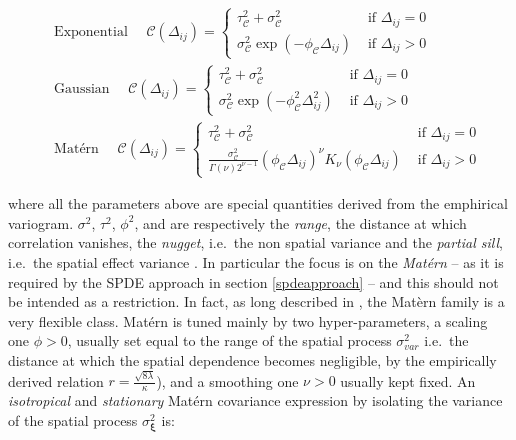 \documentclass[
  12pt,
  a4paper,
  oneside]{book}
\theoremstyle{definition}
\theoremstyle{definition}
\theoremstyle{definition}
\theoremstyle{remark}
\begin{document}
\[
\begin{aligned}
&\text { Exponential } \quad \mathscr{C}(\Delta_{i j})=\left\{\begin{array}{cl}
\tau^{2}_{\mathscr{C}}+\sigma^{2}_{\mathscr{C}} & \text { if }  \Delta_{i j}=0 \\
\sigma^{2}_{\mathscr{C}} \exp (-\phi_{\mathscr{C}} \Delta_{i j}) & \text { if } \Delta_{i j}>0 
\end{array}\right.\\
&\text { Gaussian } \quad \mathscr{C}(\Delta_{i j})=\left\{\begin{array}{cl}
\tau^{2}_{\mathscr{C}}+\sigma^{2}_{\mathscr{C}} & \text { if } \Delta_{i j}=0 \\
\sigma^{2}_{\mathscr{C}} \exp \left(-\phi^{2}_{\mathscr{C}}  \Delta_{i j}^{2}\right) & \text { if } \Delta_{i j}>0 
\end{array}\right. \\
&\text { Matérn } \quad \mathscr{C}(\Delta_{i j})=\left\{\begin{array}{cl}
\tau^{2}_{\mathscr{C}}+\sigma^{2}_{\mathscr{C}} & \text { if } \Delta_{i j}=0 \\
\frac{\sigma^{2}_{\mathscr{C}}}{\Gamma(\nu) 2^{\nu-1}}(\phi_{\mathscr{C}}  \Delta_{i j})^{\nu} K_{\nu}(\phi_{\mathscr{C}}  \Delta_{i j}) & \text { if } \Delta_{i j}>0
\end{array}\right.
\end{aligned}
\]

where all the parameters above are special quantities derived from the emphirical variogram. \(\sigma^2\), \(\tau^2\), \(\phi^2\), and are respectively the \emph{range}, the distance at which correlation vanishes, the \emph{nugget}, i.e.~the non spatial variance and the \emph{partial sill}, i.e.~the spatial effect variance \citep{LecturePaci}. In particular the focus is on the \emph{Matérn} -- as it is required by the SPDE approach in section \ref{spdeapproach} -- and this should not be intended as a restriction. In fact, as long described in \citet{gneiting2006geostatistical}, the Matèrn family is a very flexible class. Matérn is tuned mainly by two hyper-parameters, a scaling one \(\phi>0\), usually set equal to the range of the spatial process \(\sigma^{2}_{var}\) i.e.~the distance at which the spatial dependence becomes negligible, by the empirically derived relation \(r =\frac{\sqrt{8 \lambda}}{\kappa}\)), and a smoothing one \(\nu>0\) usually kept fixed. An \emph{isotropical} and \emph{stationary} Matérn covariance expression by isolating the variance of the spatial process \(\sigma_{\mathscr{\boldsymbol{\mathbf{\xi}}}}^{2}\) is:
\end{document}
